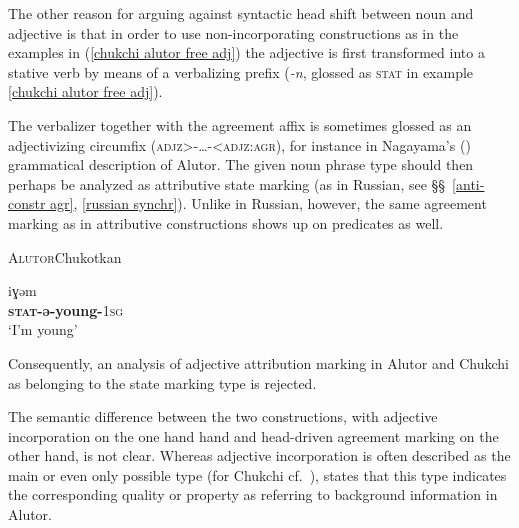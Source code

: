 The other reason for arguing against syntactic head shift between noun and adjective is that in order to use non-incorporating constructions as in the examples in (\ref{chukchi alutor free adj}) the adjective is first transformed into a stative verb by means of a verbalizing prefix (\textit{-n}, glossed as \textsc{stat} in example \ref{chukchi alutor free adj}).

The verbalizer together with the agreement affix is sometimes glossed as an adjectivizing circumfix (\textsc{adjz>-\dots-<adjz:agr}), for instance in Nagayama's (\citeyear{nagayama2003}) grammatical description of Alutor. The given noun phrase type should then perhaps be analyzed as attributive state marking (as in Russian, see \S\S~\ref{anti-constr agr}, \ref{russian synchr}). Unlike in Russian, however, the same agreement marking as in attributive constructions shows up on predicates as well.
\begin{exe}
\ex \textsc{Alutor}{Chukotkan}{\cite{nagayama2003}}
\begin{xlist}
\ex
{}iɣəm\\
	\textbf{\textsc{stat}-ə-young-}\textsc{1sg}\\
\glt	‘I'm young’
\end{xlist}
\end{exe}
Consequently, an analysis of adjective attribution marking in Alutor and Chukchi as belonging to the state marking type is rejected.

The semantic difference between the two constructions, with adjective incorporation on the one hand hand and head-driven agreement marking on the other hand, is not clear. Whereas adjective incorporation is often described as the main or even only possible type (for Chukchi cf.~\citealt[37, 101]{kampfe-etal1995}), \citet[288]{kibrik-etal2000} states that this type indicates the corresponding quality or property as referring to background information in Alutor.


